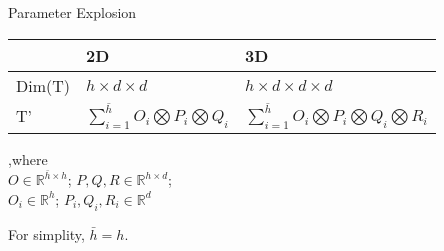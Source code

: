 \documentclass[compress]{beamer}
\begin{document}
\begin{frame}[allowframebreaks]{\secname}
\begin{block}{Parameter Explosion}
\begin{itemize}
\begin{table}[t]
\begin{tabular}{lll}
                            & 2D                                                              & 3D
                           \\ \hline
                    Dim(T)  & $h\times d \times d$                                            & $h\times d \times d \times d$                                                  \\ \hline
                    T'      & $\sum\limits_{i=1}^{\bar{h}} O_i \bigotimes P_i \bigotimes Q_i$ & $\sum\limits_{i=1}^{\bar{h}} O_i \bigotimes P_i \bigotimes Q_i \bigotimes R_i$ \\ \hline
                    \end{tabular}
                    \end{table}
                    ,where\\
                    $O \in \mathbb{R}^{\bar{h} \times h}$; $P, Q, R \in \mathbb{R}^{h\times d}$; \\
                    $O_i \in \mathbb{R}^h$; $P_i, Q_i, R_i \in \mathbb{R}^d$

                    For simplity, $\bar{h}=h$.
                \end{itemize}
            \end{block}
            


\end{frame}
\end{document}
